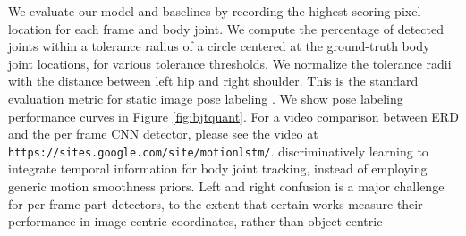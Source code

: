 \documentclass[10pt,twocolumn,letterpaper]{article}
\begin{document}
We evaluate our model and baselines by recording the highest scoring pixel location for each frame and  body joint. We compute the percentage of detected joints within a tolerance radius of a circle centered at the ground-truth body joint locations, for various  tolerance thresholds. We normalize the tolerance radii with the distance between left hip and right shoulder. This is the standard evaluation metric for static image pose labeling \cite{MODEC}. We show pose labeling performance curves  in Figure \ref{fig:bjtquant}. For a video comparison between ERD and the per frame CNN detector, please see the video at { \tt https://sites.google.com/site/motionlstm/}.
discriminatively learning to integrate temporal information  for body joint tracking, instead of employing generic motion smoothness priors.  %
Left and right confusion is a major challenge for per frame part detectors, to the extent that certain works measure their performance in image centric coordinates, rather than object centric 
\end{document}
